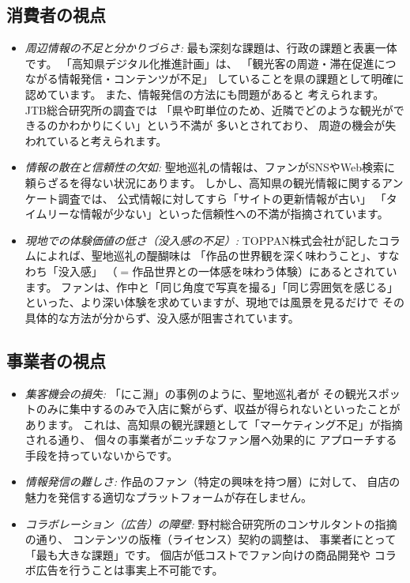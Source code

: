 \documentclass{docs}
\begin{document}
\subsection{消費者の視点}
\begin{itemize}
	\item \emph{周辺情報の不足と分かりづらさ:}
	最も深刻な課題は、行政の課題\cite{kochi_dx_plan}と表裏一体です。
	「高知県デジタル化推進計画」\cite{kochi_dx_plan}は、
	「観光客の周遊・滞在促進につながる情報発信・コンテンツが不足」
	していることを県の課題として明確に認めています。
	また、情報発信の方法にも問題があると
	考えられます。JTB総合研究所の調査\cite{jtb_trc_2017}では
	「県や町単位のため、近隣でどのような観光ができるのかわかりにくい」という不満が
	多いとされており、
	周遊の機会が失われていると考えられます。

	\item \emph{情報の散在と信頼性の欠如:}
	聖地巡礼の情報は、ファンがSNSやWeb検索に頼らざるを得ない状況にあります。
	しかし、高知県の観光情報に関するアンケート調査では、
	公式情報に対してすら「サイトの更新情報が古い」
	「タイムリーな情報が少ない」といった信頼性への不満が指摘されています\cite{kochi_tech_2017}。

	\item \emph{現地での体験価値の低さ（没入感の不足）:}
	TOPPAN株式会社が記したコラム\cite{toppan2025}によれば、聖地巡礼の醍醐味は
	「作品の世界観を深く味わうこと」、すなわち「没入感」
	（$={}$作品世界との一体感を味わう体験）にあるとされています。
	ファンは、作中と「同じ角度で写真を撮る」「同じ雰囲気を感じる」
	といった、より深い体験を求めていますが、現地では風景を見るだけで
	その具体的な方法が分からず、没入感が阻害されています。
\end{itemize}


\subsection{事業者の視点}
\begin{itemize}
\item \emph{集客機会の損失:}
	「にこ淵」の事例\cite{nikobuchi_mlit}のように、聖地巡礼者が
	その観光スポットのみに集中するのみで入店に繋がらず、収益が得られないといったことがあります。
	これは、高知県の観光課題として「マーケティング不足」が指摘される通り\cite{kochi_tech_2017}、
	個々の事業者がニッチなファン層へ効果的に
	アプローチする手段を持っていないからです。

	\item \emph{情報発信の難しさ:}
	作品のファン（特定の興味を持つ層）に対して、
	自店の魅力を発信する適切なプラットフォームが存在しません。

	\item \emph{コラボレーション（広告）の障壁:}
	野村総合研究所のコンサルタントの指摘\cite{nri2024}の通り、
	コンテンツの版権（ライセンス）契約の調整は、
	事業者にとって「最も大きな課題」です。
	個店が低コストでファン向けの商品開発や
	コラボ広告を行うことは事実上不可能です。
\end{itemize}
\end{document}
